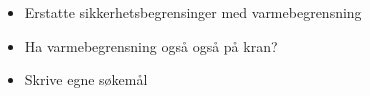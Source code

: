 
\begin{itemize}
\item Erstatte sikkerhetsbegrensinger med varmebegrensning
\item Ha varmebegrensning også også på kran?
\item Skrive egne søkemål
\end{itemize}